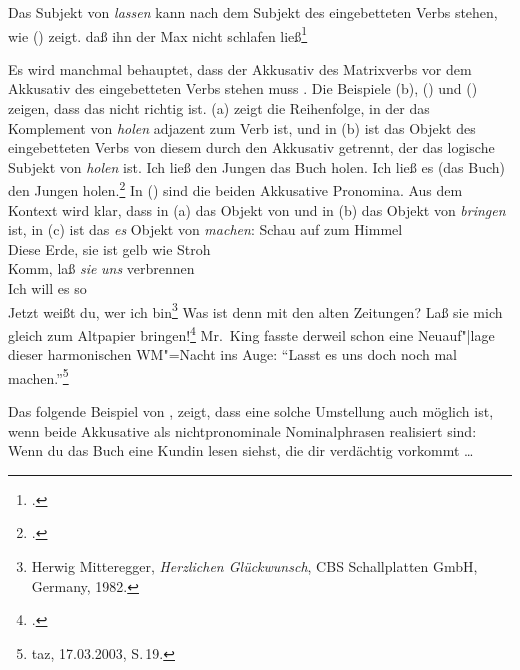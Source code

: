 Das Subjekt von \emph{lassen} kann nach dem Subjekt des eingebetteten Verbs stehen, wie ()
zeigt.
\ea
daß ihn der Max nicht schlafen ließ\footnote{
        .
}
\z

\noindent
Es wird manchmal behauptet, dass der Akkusativ des Matrixverbs
vor dem Akkusativ des eingebetteten Verbs stehen muss \citep[]{Eisenberg99a}.
Die Beispiele (b), () und () zeigen, dass das nicht richtig ist.
%
(a) zeigt die Reihenfolge, in der das Komplement von \emph{holen} adjazent zum Verb ist,
und in (b) ist das Objekt des eingebetteten Verbs von diesem durch den Akkusativ
getrennt, der das logische Subjekt von \emph{holen} ist.
\eal
\label{ex-liess-den-Jungen-das-Buch-holen}
\ex{} 
Ich ließ den Jungen    das Buch       holen.
\ex 
Ich ließ es       (das Buch)      den Jungen    holen.\footnote{
        .
}
\zl
In () sind die beiden Akkusative Pronomina. Aus dem Kontext wird klar, dass 
in (a) das Objekt von  und in (b) das Objekt von \emph{bringen}
ist, in (c) ist das \emph{es} Objekt von \emph{machen}:
\eal{}
\ex \label{ex-lass-sie-uns-verbrennen}
Schau auf zum Himmel \\
      Diese Erde, sie ist gelb wie Stroh \\
      Komm, laß \emph{sie} \emph{uns} verbrennen \\
      Ich will es so \\
      Jetzt weißt du, wer ich bin\footnote{
        Herwig Mitteregger, \emph{Herzlichen Glückwunsch}, CBS Schallplatten GmbH, Germany, 1982.
      }
\ex Was ist denn mit den alten Zeitungen? Laß sie mich gleich zum Altpapier bringen!\footnote{
        .
    }
\ex Mr.\, King fasste derweil schon eine Neuauf"|lage dieser harmonischen WM"=Nacht ins Auge: "`Lasst
    es uns doch noch mal machen."'\footnote{
        taz, 17.03.2003, S.\,19.
    }
\zl


\noindent
Das folgende Beispiel von \citet[]{Lenerz93a}, %
zeigt, dass eine solche Umstellung
auch möglich ist, wenn beide Akkusative als nichtpronominale Nominalphrasen realisiert sind:
\ea
Wenn du das Buch eine Kundin lesen siehst, die dir verdächtig vorkommt \ldots
\z

